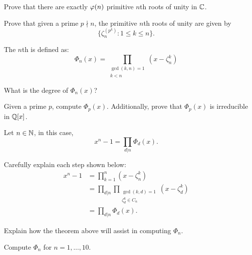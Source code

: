 \documentclass{ximera}
\begin{document}
\begin{exercise}
  Prove that there are exactly $\eulerphi(n)$ primitive $n$th roots of
  unity in $\mathbb C$.
\end{exercise}


\begin{exercise}\label{E:KP}
  Prove that given a prime $p\nmid n$, the primitive $n$th roots of
  unity are given by
  \[
  \{\zeta_n^{(p^k)}: 1\le k \le n\}.
  \]
\end{exercise}




\begin{definition}
The $n$th  is defined as:
\[
\Phi_n(x) = \prod_{\substack{\gcd(k,n)=1 \\ k<n}}(x-\zeta_n^k)
\]
\end{definition}

\begin{exercise}
  What is the degree of $\Phi_n(x)$?
\end{exercise}

\begin{exercise}
  Given a prime $p$, compute $\Phi_p(x)$. Additionally, prove that
  $\Phi_p(x)$ is irreducible in $\mathbb Q[x]$.
\end{exercise}


\begin{theorem}
  Let $n\in \mathbb N$, in this case,
  \[
  x^n-1 = \prod_{d|n} \Phi_d(x).
  \]
  \begin{sketch}
    Carefully explain each step shown below:
    \begin{align*}
      x^n - 1 &= \prod_{k=1}^n (x-\zeta_n^k) \\
      &=\prod_{d|n}\prod_{\substack{\gcd(k,d) = 1\\ \zeta_d^k \in C_n}}(x-\zeta_d^k) \\
      &=\prod_{d|n} \Phi_d(x).
    \end{align*}
  \end{sketch}
\end{theorem}

\begin{exercise}
  Explain how the theorem above will assist in computing $\Phi_n$.
\end{exercise}


\begin{exercise}
  Compute $\Phi_n$ for $n = 1, \dots, 10$.
\end{exercise}
\end{document}

